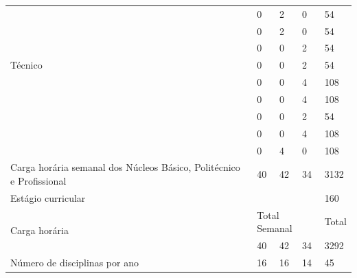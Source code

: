 \documentclass[11pt,fleqn]{book} %
\begin{document}
\begin{table}[H]
{\begin{tabular}{|l|l|l|l|l|l|}
			\multirow{7}{*}{Técnico}       
			& \nameref{disc:biotecAnimal}                                                  & 0          & 2         & 0         & 54        \\ \cline{2-6} 
			& \nameref{disc:biotecVegetal}                                                 & 0          & 2         & 0         & 54        \\ \cline{2-6} 
			& \nameref{disc:biotecAlimentos}                                               & 0          & 0         & 2         & 54        \\ \cline{2-6} 
			& \nameref{disc:biotecFarmacos}                                                & 0          & 0         & 2         & 54        \\ \cline{2-6} 
			& \nameref{disc:biotecSaude}                                                   & 0          & 0         & 4         & 108       \\ \cline{2-6} 
			& \nameref{disc:microbiologia}                                                 & 0          & 0         & 4         & 108       \\ \cline{2-6}
			& \nameref{disc:fermentacao}                                                   & 0          & 0         & 2         & 54        \\ \cline{2-6} 			
			& \nameref{disc:producao}                                                      & 0          & 0         & 4         & 108       \\ \cline{2-6} 
			& \nameref{disc:analitica}                                                     & 0          & 4         & 0         & 108       \\ \hline
			\multicolumn{2}{|l|}{Carga horária semanal dos Núcleos Básico, Politécnico e Profissional} 
			                                                                               & 40         & 42        & 34        & 3132      \\ \hline
			\multicolumn{5}{|l|}{Estágio curricular}                                                                            & 160       \\ \hline
			\multicolumn{2}{|l|}{\multirow{2}{*}{Carga horária}}                           & \multicolumn{3}{l|}{Total Semanal} & Total     \\ \cline{3-6} 
			\multicolumn{2}{|l|}{}                                                         & 40         & 42        & 34        & 3292      \\ \hline
			\multicolumn{2}{|l|}{Número de disciplinas por ano}                            & 16         & 16        & 14        & 45        \\ \hline
		\end{tabular}%
	}
\end{table}
\end{document}
